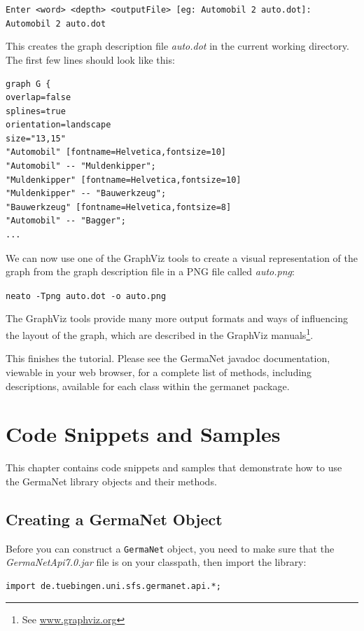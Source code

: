 \documentclass[12pt,a4paper,english,utf8]{report}
\begin{document}
\texttt{Enter <word> <depth> <outputFile> [eg: Automobil 2 auto.dot]:
Automobil 2 auto.dot}

This creates the graph description file \emph{auto.dot} in the current working directory. The first few lines should look like this:

\begin{lstlisting}
graph G {
overlap=false
splines=true
orientation=landscape
size="13,15"
"Automobil" [fontname=Helvetica,fontsize=10]
"Automobil" -- "Muldenkipper";
"Muldenkipper" [fontname=Helvetica,fontsize=10]
"Muldenkipper" -- "Bauwerkzeug";
"Bauwerkzeug" [fontname=Helvetica,fontsize=8]
"Automobil" -- "Bagger";
...
\end{lstlisting}

We can now use one of the GraphViz tools to create a visual representation of the graph from the graph description file in a PNG file called \emph{auto.png}:

\texttt{neato -Tpng auto.dot -o auto.png}

The GraphViz tools provide many more output formats and ways of influencing the layout of the graph, which are described in the GraphViz manuals\footnote{See \href{www.graphviz.org}{www.graphviz.org}}.

This finishes the tutorial. Please see the GermaNet javadoc documentation, viewable in your web browser, for a complete list of methods, including descriptions, available for each class within the germanet package.





\chapter{Code Snippets and Samples}
This chapter contains code snippets and samples that demonstrate how to use the GermaNet library objects and their methods.



\section{Creating a GermaNet Object}
\label{snippetsStart}
Before you can construct a \texttt{GermaNet} object, you need to make sure that the \emph{GermaNetApi7.0.jar} file is on your classpath, then import the library:

\begin{lstlisting}
import de.tuebingen.uni.sfs.germanet.api.*;
\end{lstlisting}
\end{document}
